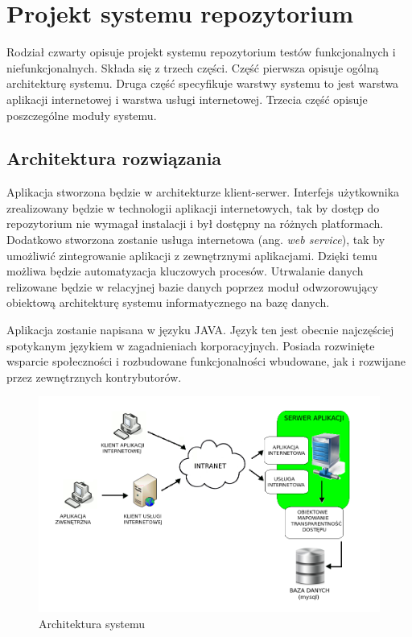 \chapter{Projekt systemu repozytorium}
Rodział czwarty opisuje projekt systemu repozytorium testów funkcjonalnych i niefunkcjonalnych. Składa się z trzech części. Część pierwsza opisuje ogólną architekturę systemu. Druga część specyfikuje warstwy systemu to jest warstwa aplikacji internetowej i warstwa usługi internetowej. Trzecia część opisuje poszczególne moduły systemu.

\section{Architektura rozwiązania}
Aplikacja stworzona będzie w architekturze klient-serwer. Interfejs użytkownika zrealizowany będzie w technologii aplikacji internetowych, tak by dostęp do repozytorium nie wymagał instalacji i był dostępny na różnych platformach. Dodatkowo stworzona zostanie usługa internetowa (ang. \textit{web service}), tak by umożliwić zintegrowanie aplikacji z zewnętrznymi aplikacjami. Dzięki temu możliwa będzie automatyzacja kluczowych procesów. Utrwalanie danych relizowane będzie w relacyjnej bazie danych poprzez moduł odwzorowujący obiektową architekturę systemu informatycznego na bazę danych.

Aplikacja zostanie napisana w języku JAVA. Język ten jest obecnie najczęściej spotykanym językiem w zagadnieniach korporacyjnych. Posiada rozwinięte wsparcie społeczności i rozbudowane funkcjonalności wbudowane, jak i rozwijane przez zewnętrznych kontrybutorów. 
\begin{figure}[h]
\centerline{\includegraphics[scale=0.45]{img/architektura.png}}
\caption{Architektura systemu}
\label{fig:architektura}
\end{figure}


